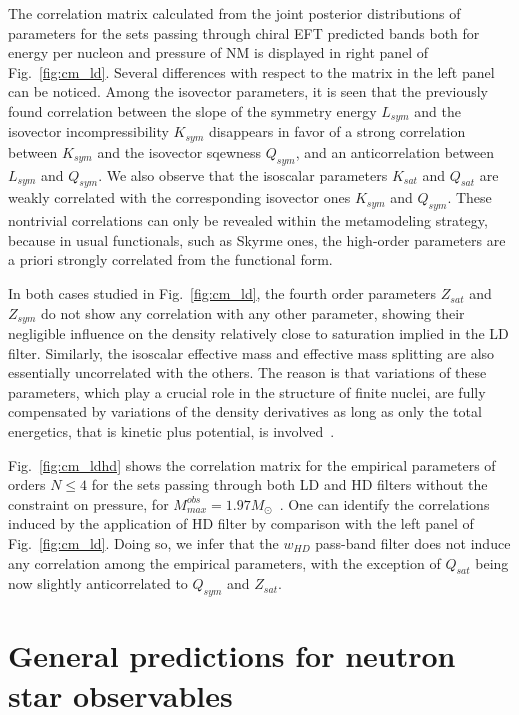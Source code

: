 The correlation matrix calculated from the joint posterior distributions of
parameters for the sets passing through chiral EFT predicted bands both for 
energy per nucleon and pressure of NM is displayed in right panel of 
Fig.~\ref{fig:cm_ld}. Several differences with respect to the matrix in the 
left panel can be noticed.
Among the isovector parameters, it is seen that the previously found 
correlation between the slope of the symmetry energy $L_{sym}$ and the 
isovector incompressibility $K_{sym}$ disappears in favor of a strong 
correlation between $K_{sym}$ and the isovector sqewness $Q_{sym}$, and an 
anticorrelation between $L_{sym}$ and $Q_{sym}$. We also observe that the 
isoscalar parameters $K_{sat}$ and $Q_{sat}$ are weakly correlated with the 
corresponding isovector ones $K_{sym}$ and $Q_{sym}$. These nontrivial 
correlations can only be revealed within the metamodeling strategy, because in 
usual functionals, such as Skyrme ones, the high-order parameters are a priori 
strongly correlated from the functional form. 

In both cases studied in Fig.~\ref{fig:cm_ld}, the fourth order parameters 
$Z_{sat}$ and $Z_{sym}$ do not show any correlation with any other parameter, 
showing their negligible influence on the density relatively close to 
saturation implied in the LD filter. Similarly, the isoscalar effective mass 
and effective mass splitting are also essentially uncorrelated 
with the others. The reason is that variations of these parameters, which play 
a crucial role in the structure of finite nuclei, are fully compensated by 
variations of the density derivatives as long as only the total energetics, 
that is kinetic plus potential, is involved~\cite{Chatterjee2017}.

Fig.~\ref{fig:cm_ldhd} shows the correlation matrix for the empirical 
parameters of orders $N \leq 4$ for the sets passing through both LD and HD 
filters without the constraint on pressure, for
$M_{max}^{obs}=1.97M_\odot$~\cite{Antoniadis2013}. One can identify the 
correlations induced by the application of HD filter by comparison with the 
left panel of Fig.~\ref{fig:cm_ld}. Doing so, we infer that the $w_{HD}$ 
pass-band filter does not induce any correlation among the 
empirical parameters, with the exception of $Q_{sat}$ being now slightly 
anticorrelated to $Q_{sym}$ and $Z_{sat}$.

\section{General predictions for neutron star observables}\label{sec:general}

